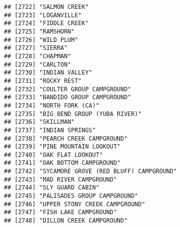 \documentclass[
]{article}
\begin{document}
\begin{verbatim}
## [2722] "SALMON CREEK"                                                                        
## [2723] "LOGANVILLE"                                                                          
## [2724] "FIDDLE CREEK"                                                                        
## [2725] "RAMSHORN"                                                                            
## [2726] "WILD PLUM"                                                                           
## [2727] "SIERRA"                                                                              
## [2728] "CHAPMAN"                                                                             
## [2729] "CARLTON"                                                                             
## [2730] "INDIAN VALLEY"                                                                       
## [2731] "ROCKY REST"                                                                          
## [2732] "COULTER GROUP CAMPGROUND"                                                            
## [2733] "BANDIDO GROUP CAMPGROUND"                                                            
## [2734] "NORTH FORK (CA)"                                                                     
## [2735] "BIG BEND GROUP (YUBA RIVER)"                                                         
## [2736] "SKILLMAN"                                                                            
## [2737] "INDIAN SPRINGS"                                                                      
## [2738] "PEARCH CREEK CAMPGROUND"                                                             
## [2739] "PINE MOUNTAIN LOOKOUT"                                                               
## [2740] "OAK FLAT LOOKOUT"                                                                    
## [2741] "OAK BOTTOM CAMPGROUND"                                                               
## [2742] "SYCAMORE GROVE (RED BLUFF) CAMPGROUND"                                               
## [2743] "MAD RIVER CAMPGROUND"                                                                
## [2744] "SLY GUARD CABIN"                                                                     
## [2745] "PALISADES GROUP CAMPGROUND"                                                          
## [2746] "UPPER STONY CREEK CAMPGROUND"                                                        
## [2747] "FISH LAKE CAMPGROUND"                                                                
## [2748] "DILLON CREEK CAMPGROUND"                                                             

\end{verbatim}
\end{document}
